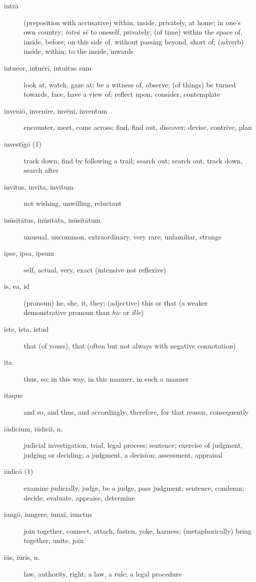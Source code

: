 \begin{description}
    \item[intrā] \marginnote{*}(preposition with accusative) within, inside, privately, at home; in one's own country; \textit{intrā sē} to oneself, privately; (of time) within the space of, inside, before; on this side of, without passing beyond, short of; (adverb) inside, within; to the inside, inwards
    \item[intueor, intuērī, intuitus sum] look at, watch, gaze at; be a witness of, observe; (of things) be turned towards, face, have a view of; reflect upon, consider, contemplate
    \item[inveniō, invenīre, invēnī, inventum] \marginnote{*}encounter, meet, come across; find, find out, discover; devise, contrive, plan
    \item[investīgō (1)] track down, find by following a trail; search out; search out, track down, search after
    \item[invītus, invīta, invītum] not wishing, unwilling, reluctant
    \item[inūsitātus, inūsitāta, inūsitātum] unusual, uncommon, extraordinary, very rare; unfamiliar, strange
    \item[ipse, ipsa, ipsum] \marginnote{*}self, actual, very, exact (intensive not reflexive)
    \item[is, ea, id] \marginnote{*}(pronoun) he, she, it, they; (adjective) this or that (a weaker demonstrative pronoun than \textit{hic} or \textit{ille})
    \item[iste, ista, istud] \marginnote{*}that (of yours), that (often but not always with negative connotation)
    \item[ita] \marginnote{*}thus, so; in this way, in this manner, in such a manner
    \item[itaque] \marginnote{*}and so, and thus, and accordingly; therefore, for that reason, consequently
    \item[iūdicium, iūdiciī, n.] \marginnote{*}judicial investigation, trial, legal process; sentence; exercise of judgment, judging or deciding; a judgment, a decision; assessment, appraisal
    \item[iūdicō (1)] \marginnote{*}examine judicially, judge, be a judge, pass judgment; sentence, condemn; decide, evaluate, appraise, determine
    \item[iungō, iungere, iunxī, iunctus] \marginnote{*}join together, connect, attach, fasten, yoke, harness; (metaphorically) bring together, unite, join
    \item[iūs, iūris, n.] \marginnote{*}law, authority, right; a law, a rule; a legal procedure

\end{description}
